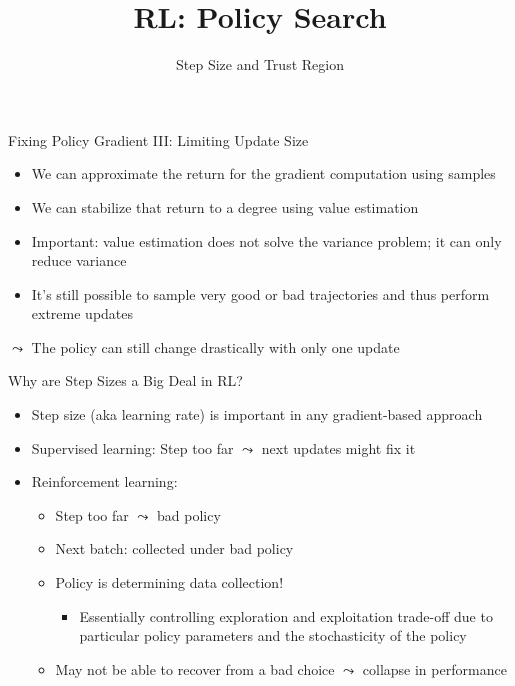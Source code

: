 \documentclass[aspectratio=169]{../latex_main/tntbeamer}  %
\title[RL: Policy Gradient]{RL: Policy Search}
\subtitle{Step Size and Trust Region}
\begin{document}
	
	\maketitle

\begin{frame}[c]{Fixing Policy Gradient III: Limiting Update Size}
\begin{itemize}
    \item We can approximate the return for the gradient computation using samples
    \item We can stabilize that return to a degree using value estimation
    \item Important: value estimation does not solve the variance problem; it can only reduce variance
    \item It's still possible to sample very good or bad trajectories and thus perform extreme updates
\end{itemize}	
\bigskip
$\leadsto$ The policy can still change drastically with only one update
\end{frame}

\begin{frame}[c]{Why are Step Sizes a Big Deal in RL?}
	
    \begin{itemize}
        \item Step size (aka learning rate) is important in any gradient-based approach
        \item Supervised learning: Step too far $\leadsto$ next updates might fix it
        \item Reinforcement learning:
        \begin{itemize}
            \item Step too far $\leadsto$ bad policy
            \item Next batch: collected under bad policy
            \item \alert{Policy is determining data collection!} 
            \begin{itemize}
                \item Essentially controlling exploration and exploitation trade-off due to particular policy parameters and the stochasticity of the policy
            \end{itemize}
            \item May not be able to recover from a bad choice $\leadsto$ collapse in performance
        \end{itemize}
    \end{itemize}

\end{frame}
\end{document}
